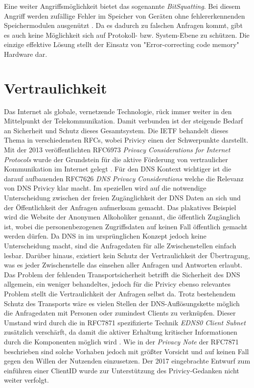  Eine weiter Angriffsmöglichkeit bietet das sogenannte \textit{BitSquatting}. Bei diesem Angriff werden zufällige Fehler im Speicher von Geräten ohne fehlererkennenden Speichermodulen ausgenützt \cite{Dinaburg2011}. Da es dadurch zu falschen Anfragen kommt, gibt es auch keine Möglichkeit sich auf Protokoll- bzw. System-Ebene zu schützen. Die einzige effektive Lösung stellt der Einsatz von "Error-correcting code memory" Hardware dar.  


\section{Vertraulichkeit}

Das Internet als globale, vernetzende Technologie, rück immer weiter in den Mittelpunkt der Telekommunikation. Damit verbunden ist der steigende Bedarf an Sicherheit und Schutz dieses Gesamtsystem. Die IETF behandelt dieses Thema in verschiedensten RFCs, wobei Privicy einen der Schwerpunkte darstellt. Mit der 2013 veröffentlichten RFC6973 \textit{Privacy Considerations for Internet Protocols} wurde der Grundstein für die aktive Förderung von vertraulicher Kommunikation im Internet gelegt \cite{Cooper2013}. 
Für den DNS Kontext wichtiger ist die darauf aufbauenden RFC7626 \textit{DNS Privacy Considerations}\cite{Bortzmeyer2015} welche die Relevanz von DNS Privicy klar macht. Im speziellen wird auf die notwendige Unterscheidung zwischen der freien Zugänglichkeit der DNS Daten an sich und der Öffentlichkeit der Anfragen aufmerksam gemacht. Das plakatives Beispiel wird die Website der Anonymen Alkoholiker genannt, die öffentlich Zugänglich ist, wobei die personenbezogenen Zugriffsdaten auf keinen Fall öffentlich gemacht werden dürfen. Da DNS in im ursprünglichen Konzept jedoch keine Unterscheidung macht, sind die Anfragedaten für alle Zwischenstellen einfach lesbar. Darüber hinaus, existiert kein Schutz der Vertraulichkeit der Übertragung, was es jeder Zwischenstelle das einsehen aller Anfragen und Antworten erlaubt.
Das Problem der fehlenden Transportsicherheit betrifft die Sicherheit des DNS allgemein, ein weniger behandeltes, jedoch für die Privicy ebenso relevantes Problem stellt die Vertraulichkeit der Anfragen selbst da. Trotz bestehendem Schutz des Transports wäre es vielen Stellen der DNS-Auflösungskette möglich die Anfragedaten mit Personen oder zumindest Clients zu verknüpfen. Dieser Umstand wird durch die in RFC7871 spezifizierte Technik \textit{EDNS0 Client Subnet} zusätzlich verschärft, da damit die aktiver Erhaltung kritischer Informationen durch die Komponenten möglich wird \cite{Contavalli2016}. Wie in der \textit{Privacy Note} der RFC7871 beschrieben sind solche Vorhaben jedoch mit größter Vorsicht und auf keinen Fall gegen den Willen der Nutzenden einzusetzen. Der 2017 eingebrachte Entwurf zum einführen einer ClientID\cite{Licht2017} wurde zur Unterstützung des Privicy-Gedanken nicht weiter verfolgt.

